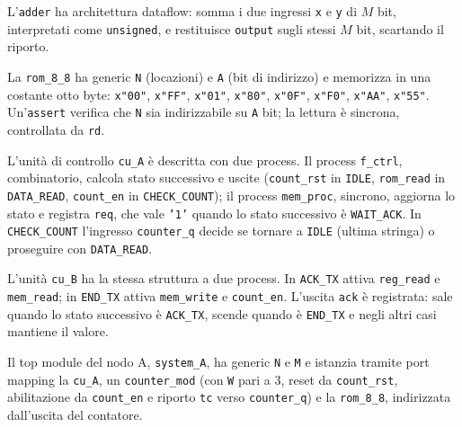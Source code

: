 L'\texttt{adder} ha architettura dataflow: somma i due ingressi \texttt{x} e \texttt{y} di $M$ bit, interpretati come \texttt{unsigned}, e restituisce \texttt{output} sugli stessi $M$ bit, scartando il riporto.


La \texttt{rom\_8\_8} ha generic \texttt{N} (locazioni) e \texttt{A} (bit di indirizzo) e memorizza in una costante otto byte: \texttt{x"00"}, \texttt{x"FF"}, \texttt{x"01"}, \texttt{x"80"}, \texttt{x"0F"}, \texttt{x"F0"}, \texttt{x"AA"}, \texttt{x"55"}. Un'\texttt{assert} verifica che \texttt{N} sia indirizzabile su \texttt{A} bit; la lettura è sincrona, controllata da \texttt{rd}.


L'unità di controllo \texttt{cu\_A} è descritta con due process. Il process \texttt{f\_ctrl}, combinatorio, calcola stato successivo e uscite (\texttt{count\_rst} in \texttt{IDLE}, \texttt{rom\_read} in \texttt{DATA\_READ}, \texttt{count\_en} in \texttt{CHECK\_COUNT}); il process \texttt{mem\_proc}, sincrono, aggiorna lo stato e registra \texttt{req}, che vale \texttt{'1'} quando lo stato successivo è \texttt{WAIT\_ACK}. In \texttt{CHECK\_COUNT} l'ingresso \texttt{counter\_q} decide se tornare a \texttt{IDLE} (ultima stringa) o proseguire con \texttt{DATA\_READ}.


L'unità \texttt{cu\_B} ha la stessa struttura a due process. In \texttt{ACK\_TX} attiva \texttt{reg\_read} e \texttt{mem\_read}; in \texttt{END\_TX} attiva \texttt{mem\_write} e \texttt{count\_en}. L'uscita \texttt{ack} è registrata: sale quando lo stato successivo è \texttt{ACK\_TX}, scende quando è \texttt{END\_TX} e negli altri casi mantiene il valore.


Il top module del nodo A, \texttt{system\_A}, ha generic \texttt{N} e \texttt{M} e istanzia tramite port mapping la \texttt{cu\_A}, un \texttt{counter\_mod} (con \texttt{W} pari a 3, reset da \texttt{count\_rst}, abilitazione da \texttt{count\_en} e riporto \texttt{tc} verso \texttt{counter\_q}) e la \texttt{rom\_8\_8}, indirizzata dall'uscita del contatore.

